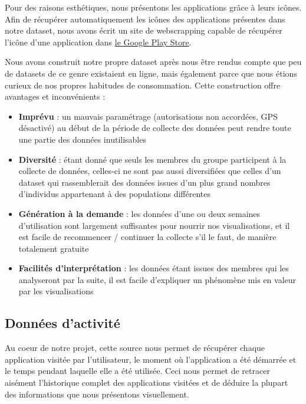 \documentclass[a4paper, 11pt]{article}
\begin{document}
        Pour des raisons esthétiques, nous présentons les applications grâce à leurs icônes. Afin de récupérer automatiquement les icônes des applications présentes dans notre dataset, nous avons écrit un site de webscrapping capable de récupérer l'icône d'une application dans \href{https://play.google.com/store/apps?hl=fr}{le Google Play Store}.

        Nous avons construit notre propre dataset après nous être rendus compte que peu de datasets de ce genre existaient en ligne, mais également parce que nous étions curieux de nos propres habitudes de consommation. Cette construction offre avantages et inconvénients :
        \begin{itemize}
            \item \textbf{\color{red} Imprévu} : un mauvais paramétrage (autorisations non accordées, GPS désactivé) au début de la période de collecte des données peut rendre toute une partie des données inutilisables
            \item \textbf{\color{red} Diversité} : étant donné que seuls les membres du groupe participent à la collecte de données, celles-ci ne sont pas aussi diversifiées que celles d'un dataset qui rassemblerait des données issues d'un plus grand nombres d'individus appartenant à des populations différentes
            \item \textbf{\color{green} Génération à la demande} : les données d'une ou deux semaines d'utilisation sont largement suffisantes pour nourrir nos visualisations, et il est facile de recommencer / continuer la collecte s'il le faut, de manière totalement gratuite
            \item \textbf{\color{green} Facilités d'interprétation} : les données étant issues des membres qui les analyseront par la suite, il est facile d'expliquer un phénomène mis en valeur par les visualisations
        \end{itemize}

        \subsection{Données d'activité}
        Au coeur de notre projet, cette source nous permet de récupérer chaque application visitée par l'utilisateur, le moment où l'application a été démarrée et le temps pendant laquelle elle a été utilisée. Ceci nous permet de retracer aisément l'historique complet des applications visitées et de déduire la plupart des informations que nous présentons visuellement.
\end{document}
